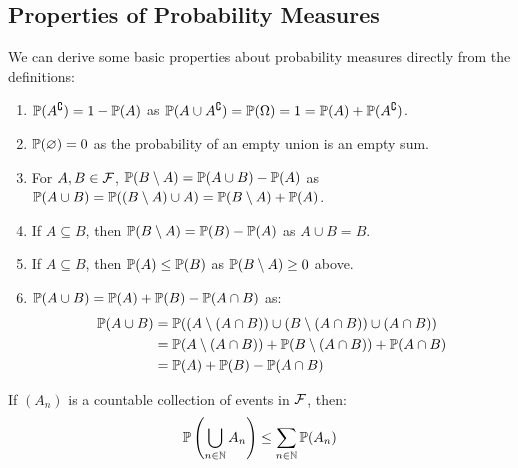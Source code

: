 \documentclass[../main.tex]{subfiles}
\begin{document}
\subsection{Properties of Probability Measures}
We can derive some basic properties about probability measures directly from the definitions:
\label{propertiesOfProbMeasure}
\begin{enumerate}
  \item $\P(A^{\comp}) = 1 - \P(A)$ as $\P(A \cup A^{\comp}) = \P(\Omega) = 1 = \P(A) + \P(A^{\comp})$.
  \item $\P(\emptyset) = 0$ as the probability of an empty union is an empty sum.
  \item For $A, B \in \salg$, $\P(B \setminus A) = \P(A \cup B) - \P(A)$ as $\P(A \cup B) = \P((B \setminus A) \cup A) = \P(B \setminus A) + \P(A)$.
  \item If $A \subseteq B$, then $\P(B \setminus A) = \P(B) - \P(A)$ as $A \cup B = B$.
  \item If $A \subseteq B$, then $\P(A) \leq \P(B)$ as $\P(B \setminus A) \geq 0$ above.
  \item $\P(A \cup B) = \P(A) + \P(B) - \P(A \cap B)$ as:
    \begin{align*}
      \P(A \cup B) &= \P((A \setminus (A \cap B)) \cup (B \setminus (A \cap B)) \cup (A \cap B)) \\
                   &= \P(A \setminus (A \cap B)) + \P(B \setminus (A \cap B)) + \P(A \cap B) \\
                   &= \P(A) + \P(B) - \P(A \cap B)
    \end{align*}
\end{enumerate}
\begin{proposition}
  If $(A_n)$ is a countable collection of events in $\salg$, then:
  \[
    \P\left(\bigcup_{n \in \N} A_n\right) \leq \sum_{n \in \N} \P(A_n)
  \]
  \label{countableSub}
\end{proposition}
\end{document}
